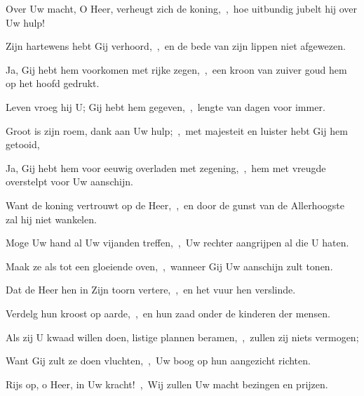 \documentclass[12pt,twoside,a5paper]{article}
\begin{document}


\begin{halfparskip}
  Over Uw macht, O Heer, verheugt zich de koning,~\sep\ hoe uitbundig jubelt hij over Uw hulp!


  Zijn hartewens hebt Gij verhoord,~\sep\ en de bede van zijn lippen niet afgewezen.

  Ja, Gij hebt hem voorkomen met rijke zegen,~\sep\ een kroon van zuiver goud hem op het hoofd gedrukt.

  Leven vroeg hij U; Gij hebt hem gegeven,~\sep\ lengte van dagen voor immer.

  Groot is zijn roem, dank aan Uw hulp;~\sep\ met majesteit en luister hebt Gij hem getooid,

  Ja, Gij hebt hem voor eeuwig overladen met zegening,~\sep\ hem met vreugde overstelpt voor Uw aanschijn.

  Want de koning vertrouwt op de Heer,~\sep\ en door de gunst van de Allerhoogste zal hij niet wankelen.
\end{halfparskip}


\begin{halfparskip}
  Moge Uw hand al Uw vijanden treffen,~\sep\ Uw rechter aangrijpen al die U haten.

  Maak ze als tot een gloeiende oven,~\sep\ wanneer Gij Uw aanschijn zult tonen.

  Dat de Heer hen in Zijn toorn vertere,~\sep\ en het vuur hen verslinde.

  Verdelg hun kroost op aarde,~\sep\ en hun zaad onder de kinderen der mensen.

  Als zij U kwaad willen doen, listige plannen beramen,~\sep\ zullen zij niets vermogen;

  Want Gij zult ze doen vluchten,~\sep\ Uw boog op hun aangezicht richten.

  Rijs op, o Heer, in Uw kracht!~\sep\ Wij zullen Uw macht bezingen en prijzen.
\end{halfparskip}


\end{document}

